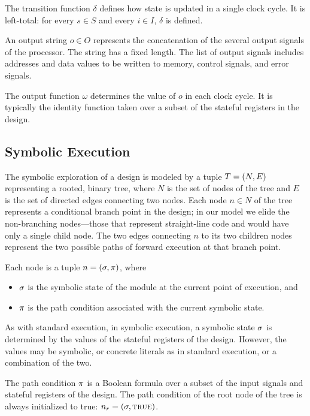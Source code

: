 The transition function $\delta$ defines how state is updated in a single clock
cycle. It is left-total: for every $s \in S$ and every $i \in I$, $\delta$ is defined.

An output string $o \in O$ represents the concatenation of the several output
signals of the processor. The string has a fixed length. The list of output
signals includes addresses and data values to be written to memory, control
signals, and error signals.

The output function $\omega$ determines the value of $o$ in each clock cycle. It
is typically the identity function taken over a subset of the stateful registers
in the design.

\subsection{Symbolic Execution}


The symbolic exploration of a design is modeled by a tuple $T = (N,E)$ representing a rooted, binary tree, where
$N$ is the set of nodes of the tree and $E$ is the set of directed edges connecting
two nodes. Each node $n \in N$ of the tree represents a conditional branch point in the
design; in our model we elide the non-branching nodes---those that represent
straight-line code and would have only a single child node. The two edges connecting $n$ to its two children nodes represent the two
possible paths of forward execution at that branch point.

Each node is a tuple $n = (\sigma, \pi)$, where
\begin{itemize}
\item $\sigma$ is the symbolic state of the module at the current point of
  execution, and
\item $\pi$ is the path condition associated with the current
  symbolic state.
\end{itemize}


As with standard execution, in symbolic execution, a symbolic state $\sigma$
is determined by the values of the stateful registers of the design. However,
the values may be symbolic, or
concrete literals as in standard execution, or a combination of the two.

The path condition $\pi$ is a Boolean formula over a subset of the input signals and
stateful registers of the design. The path condition of the root node of the
tree is always initialized to true: $n_r = (\sigma, \mathtt{\textsc{true}})$.

